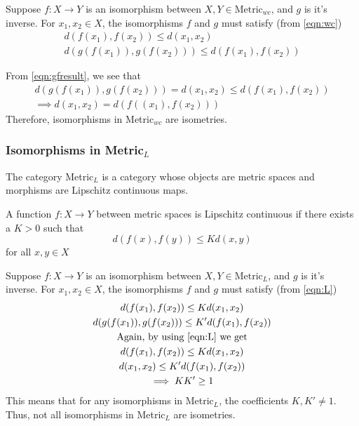 \begin{frame}
    Suppose \(f:X\rightarrow Y\) is an isomorphism between \(X,Y\in \text{Metric}_{wc}\), and \(g\) is it's inverse. 
    For \(x_1,x_2\in X\), the isomorphisms \(f\) and \(g\) must satisfy (from \autoref{eqn:wc})
    \begin{gather}
        d(f(x_1),f(x_2))\leq d(x_1,x_2)\\
        d(g(f(x_1)),g(f(x_2)))\leq d(f(x_1),f(x_2))
    \end{gather}

    From \autoref{eqn:gfresult}, we see that 
    \begin{gather*}
        d(g(f(x_1)),g(f(x_2)))=d(x_1, x_2)\leq d(f(x_1),f(x_2))\\
        \implies d(x_1,x_2)=d(f((x_1),f(x_2)))
    \end{gather*}
    \pause
    Therefore, isomorphisms in Metric\(_{wc}\) are isometries.

\end{frame}

\begin{frame}
    \frametitle{Isomorphisms in Metric\(_{L}\)}
    The category Metric\(_{L}\) is a category whose objects are metric spaces and morphisms are Lipschitz continuous maps.
    \pause
    \begin{definition}
        A function \(f : X \rightarrow Y\) between metric spaces is
        Lipschitz continuous if there exists a \(K > 0\) such that
        \begin{equation}
            d(f(x),f(y))\leq Kd(x,y)
            \label{eqn:L}
        \end{equation}
        for all \(x,y\in X\)
    \end{definition}    

\end{frame}

\begin{frame}
    Suppose \(f:X\rightarrow Y\) is an isomorphism between \(X,Y\in \text{Metric}_{L}\), and \(g\) is it's inverse. 
    For \(x_1,x_2\in X\), the isomorphisms \(f\) and \(g\) must satisfy (from \autoref{eqn:L})
    \begin{gather}
        d(f(x_1),f(x_2))\leq Kd(x_1,x_2)\\
        d(g(f(x_1)),g(f(x_2)))\leq K'd(f(x_1),f(x_2))\\
        \text{Again, by using \autoref{eqn:L} we get}\\
        d(f(x_1),f(x_2))\leq Kd(x_1,x_2)\\
        d(x_1,x_2)\leq K'd(f(x_1),f(x_2))\\
        \implies KK' \geq 1
    \end{gather}
    \pause
    This means that for any isomorphisms in Metric\(_{L}\), the coefficients \(K,K'\neq 1\). 
    Thus, not all isomorphisms in Metric\(_L\) are isometries.

\end{frame}


